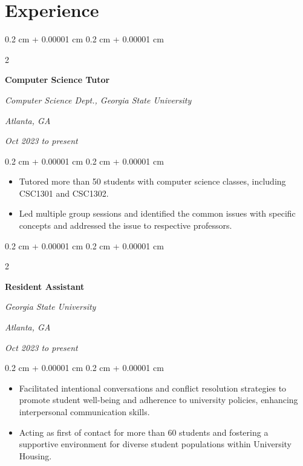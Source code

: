 \documentclass[12pt, letterpaper]{article}
\newenvironment{highlights}{
    \begin{itemize}[
        topsep=0.10 cm,
        parsep=0.10 cm,
        partopsep=0pt,
        itemsep=0pt,
        leftmargin=0.4 cm + 10pt
    ]
}{
    \end{itemize}
} %
\newenvironment{onecolentry}{
    \begin{adjustwidth}{
        0.2 cm + 0.00001 cm
    }{
        0.2 cm + 0.00001 cm
    }
}{
    \end{adjustwidth}
} %
\newenvironment{twocolentry}[2][]{
    \onecolentry
    \def\secondColumn{#2}
    \setcolumnwidth{\fill, 4.5 cm}
    \begin{paracol}{2}
}{
    \switchcolumn \raggedleft \secondColumn
    \end{paracol}
    \endonecolentry
} %
\begin{document}
    
    \section{Experience}



        
        \begin{twocolentry}{
        \textit{Atlanta, GA}

        \textit{Oct 2023 to present}}
            \textbf{Computer Science Tutor}

            \textit{Computer Science Dept., Georgia State University}
        \end{twocolentry}

        \vspace{0.10 cm}
        \begin{onecolentry}
            \begin{highlights}
                \item Tutored more than 50 students with computer science classes, including CSC1301 and CSC1302.
                \item Led multiple group sessions and identified the common issues with specific concepts and addressed the issue to respective professors.
            \end{highlights}
        \end{onecolentry}


        \vspace{0.2 cm}

        \begin{twocolentry}{
        \textit{Atlanta, GA}

        \textit{Oct 2023 to present}}
            \textbf{Resident Assistant}

            \textit{Georgia State University}
        \end{twocolentry}

        \vspace{0.10 cm}
        \begin{onecolentry}
            \begin{highlights}
                \item Facilitated intentional conversations and conflict resolution strategies to promote student well-being and adherence to university policies, enhancing interpersonal communication skills.
                \item Acting as first of contact for more than 60 students and fostering a supportive environment for diverse student populations within University Housing.
            \end{highlights}
        \end{onecolentry}
\end{document}
